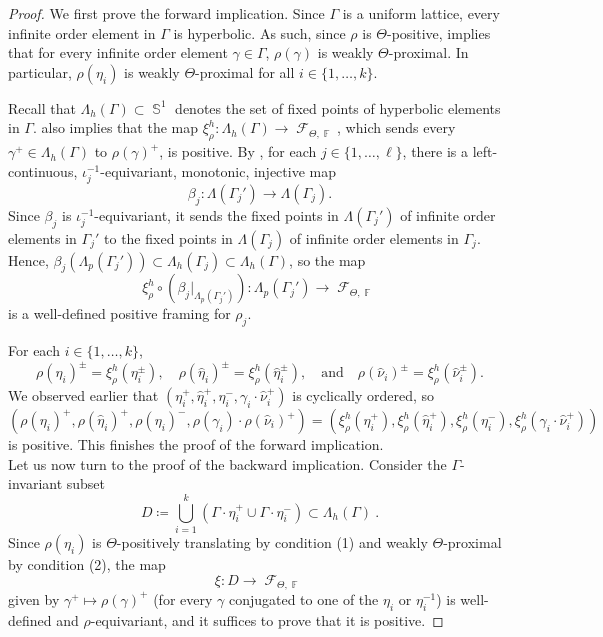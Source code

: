 \documentclass{amsart}
\theoremstyle{plain}
\theoremstyle{definition}
\DeclareMathOperator{\Fc}{\mathcal{F}}
\DeclareMathOperator{\Fb}{{\mathbb{F}}}
\DeclareMathOperator{\Sb}{\mathbb{S}}
\newcommand{\1}{\mathbf{1}}
\begin{document}
\begin{proof}
    We first prove the forward implication. Since $\Gamma$ is a uniform lattice, every infinite order element in $\Gamma$ is hyperbolic. As such, since $\rho$ is $\Theta$-positive,  implies that for every infinite order element $\gamma\in\Gamma$, $\rho(\gamma)$ is weakly $\Theta$-proximal. In particular, $\rho(\eta_i)$ is weakly $\Theta$-proximal for all $i\in \{1,\ldots, k\}$.
    
    Recall that $\Lambda_h(\Gamma)\subset \Sb^1$ denotes the set of fixed points of hyperbolic elements in $\Gamma$.  also implies that the map $\xi_\rho^h:\Lambda_h(\Gamma)\to\Fc_{\Theta,\Fb}$, which sends every $\gamma^+\in\Lambda_h(\Gamma)$ to $\rho(\gamma)^+$, is positive. By , for each $j\in\{1,\dots,\ell\}$, there is a left-continuous, $\iota_j^{-1}$-equivariant, monotonic, injective map
    \[\beta_j:\Lambda(\Gamma_j')\to\Lambda(\Gamma_j).\]
    Since $\beta_j$ is $\iota_j^{-1}$-equivariant, it sends the fixed points in $\Lambda(\Gamma_j')$ of infinite order elements in $\Gamma_j'$ to the fixed points in $\Lambda(\Gamma_j)$ of infinite order elements in $\Gamma_j$. Hence, $\beta_j(\Lambda_p(\Gamma_j'))\subset\Lambda_h(\Gamma_j)\subset\Lambda_h(\Gamma)$, so the map 
    \[\xi^h_\rho\circ(\beta_j|_{\Lambda_p(\Gamma_j')}):\Lambda_p(\Gamma_j')\to\Fc_{\Theta,\Fb}\]
    is a well-defined positive framing for $\rho_j$.

For each $i\in\{1,\dots,k\}$, 
    \[\rho(\eta_i)^\pm=\xi^h_\rho(\eta_i^\pm),\quad\rho(\hat\eta_i)^\pm=\xi^h_\rho(\hat\eta_i^\pm),\quad\text{and}\quad \rho(\hat\nu_i)^\pm=\xi^h_\rho(\hat\nu_i^\pm).\]
    We observed earlier that $(\eta_i^+,\hat\eta_i^+,\eta_i^-,\gamma_i\cdot\hat\nu_i^+)$ is cyclically ordered, so 
    \[\left(\rho(\eta_i)^+,\rho(\hat\eta_i)^+,\rho(\eta_i)^-,\rho(\gamma_i)\cdot \rho(\hat\nu_i)^+\right)=\left(\xi^h_\rho(\eta_i^+),\xi^h_\rho(\hat\eta_i^+),\xi^h_\rho(\eta_i^-),\xi^h_\rho(\gamma_i\cdot\hat\nu_i^+)\right)\] 
    is positive.   This finishes the proof of the forward implication.\\
    
    Let us now turn to the proof of the backward implication. Consider the $\Gamma$-invariant subset \[D\coloneqq \bigcup_{i=1}^k(\Gamma\cdot \eta_i^+\cup\Gamma\cdot\eta_i^-) \subset \Lambda_h(\Gamma)~.\] 
    Since $\rho(\eta_i)$ is $\Theta$-positively translating by condition (1) and weakly $\Theta$-proximal by condition (2), the map 
    \[\xi \colon D\to\Fc_{\Theta,\Fb}\]
    given by $\gamma^+\mapsto\rho(\gamma)^+$ (for every $\gamma$ conjugated to one of the $\eta_i$ or $\eta_i^{-1}$) is well-defined and $\rho$-equivariant, and it suffices to prove that it is positive. 
    

\end{proof}
\end{document}
